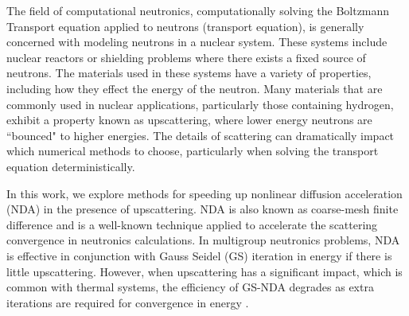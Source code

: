 
The field of computational neutronics, computationally solving the Boltzmann Transport equation applied to neutrons (transport equation), is generally concerned with modeling neutrons in a nuclear system. These systems include nuclear reactors or shielding problems where there exists a fixed source of neutrons. The materials used in these systems have a variety of properties, including how they effect the energy of the neutron. Many materials that are commonly used in nuclear applications, particularly those containing hydrogen, exhibit a property known as upscattering, where lower energy neutrons are ``bounced" to higher energies. The details of scattering can dramatically impact which numerical methods to choose, particularly when solving the transport equation deterministically. 



In this work, we explore methods for speeding up nonlinear diffusion acceleration (NDA) in the presence of upscattering. NDA is also known as coarse-mesh finite difference and is a well-known technique applied to accelerate the scattering convergence in neutronics calculations. In multigroup neutronics problems, NDA is effective in conjunction with Gauss Seidel (GS) iteration in energy if there is little upscattering. However, when upscattering has a significant impact, which is common with thermal systems, the efficiency of GS-NDA degrades as extra iterations are required for convergence in energy \cite{park-nda}.

